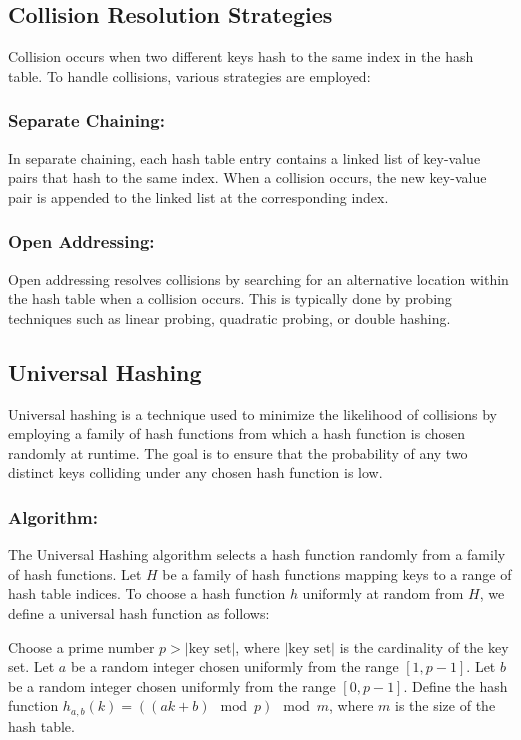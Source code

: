 \documentclass[12pt]{book} %
\begin{document}
\subsection{Collision Resolution Strategies}

Collision occurs when two different keys hash to the same index in the hash table. To handle collisions, various strategies are employed:

\subsubsection{Separate Chaining:}
In separate chaining, each hash table entry contains a linked list of key-value pairs that hash to the same index. When a collision occurs, the new key-value pair is appended to the linked list at the corresponding index.

\subsubsection{Open Addressing:}
Open addressing resolves collisions by searching for an alternative location within the hash table when a collision occurs. This is typically done by probing techniques such as linear probing, quadratic probing, or double hashing.

\subsection{Universal Hashing}

Universal hashing is a technique used to minimize the likelihood of collisions by employing a family of hash functions from which a hash function is chosen randomly at runtime. The goal is to ensure that the probability of any two distinct keys colliding under any chosen hash function is low.

\subsubsection{Algorithm:}
The Universal Hashing algorithm selects a hash function randomly from a family of hash functions. Let \(H\) be a family of hash functions mapping keys to a range of hash table indices. To choose a hash function \(h\) uniformly at random from \(H\), we define a universal hash function as follows:
\FloatBarrier
\begin{algorithm}[H]
\caption{Universal Hashing}
\begin{algorithmic}[1]
\State Choose a prime number \(p > |\text{key set}|\), where \(|\text{key set}|\) is the cardinality of the key set.
\State Let \(a\) be a random integer chosen uniformly from the range \([1, p-1]\).
\State Let \(b\) be a random integer chosen uniformly from the range \([0, p-1]\).
\State Define the hash function \(h_{a,b}(k) = ((ak + b) \mod p) \mod m\), where \(m\) is the size of the hash table.
\end{algorithmic}
\end{algorithm}
\FloatBarrier
\end{document}
